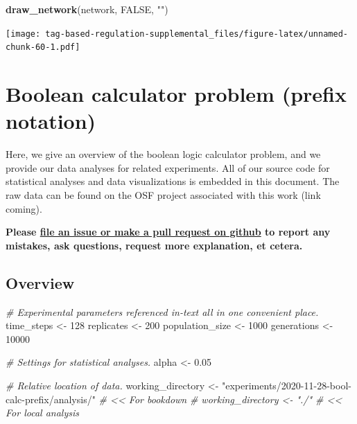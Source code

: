 \documentclass[
]{book}
\newenvironment{Shaded}{\begin{snugshade}}{\end{snugshade}}
\newcommand{\CommentTok}[1]{\textcolor[rgb]{0.56,0.35,0.01}{\textit{#1}}}
\newcommand{\DecValTok}[1]{\textcolor[rgb]{0.00,0.00,0.81}{#1}}
\newcommand{\FloatTok}[1]{\textcolor[rgb]{0.00,0.00,0.81}{#1}}
\newcommand{\KeywordTok}[1]{\textcolor[rgb]{0.13,0.29,0.53}{\textbf{#1}}}
\newcommand{\NormalTok}[1]{#1}
\newcommand{\OtherTok}[1]{\textcolor[rgb]{0.56,0.35,0.01}{#1}}
\newcommand{\StringTok}[1]{\textcolor[rgb]{0.31,0.60,0.02}{#1}}
\begin{document}
\begin{Shaded}
\begin{Highlighting}[]
\KeywordTok{draw\_network}\NormalTok{(network, }\OtherTok{FALSE}\NormalTok{, }\StringTok{""}\NormalTok{)}
\end{Highlighting}
\end{Shaded}

\texttt{[image: tag-based-regulation-supplemental\_files/figure-latex/unnamed-chunk-60-1.pdf]}

\hypertarget{boolean-calculator-problem-prefix-notation}{%
\chapter{Boolean calculator problem (prefix notation)}\label{boolean-calculator-problem-prefix-notation}}

Here, we give an overview of the boolean logic calculator problem, and we provide our data analyses for related experiments.
All of our source code for statistical analyses and data visualizations is embedded in this document.
The raw data can be found on the OSF project associated with this work (link coming).

\textbf{Please \href{https://github.com/amlalejini/Tag-based-Genetic-Regulation-for-LinearGP/issues}{file an issue or make a pull request on github} to report any mistakes, ask questions, request more explanation, et cetera.}

\hypertarget{overview-3}{%
\section{Overview}\label{overview-3}}

\begin{Shaded}
\begin{Highlighting}[]
\CommentTok{\# Experimental parameters referenced in{-}text all in one convenient place.}
\NormalTok{time\_steps \textless{}{-}}\StringTok{ }\DecValTok{128}
\NormalTok{replicates \textless{}{-}}\StringTok{ }\DecValTok{200}
\NormalTok{population\_size \textless{}{-}}\StringTok{ }\DecValTok{1000}
\NormalTok{generations \textless{}{-}}\StringTok{ }\DecValTok{10000}

\CommentTok{\# Settings for statistical analyses.}
\NormalTok{alpha \textless{}{-}}\StringTok{ }\FloatTok{0.05}

\CommentTok{\# Relative location of data.}
\NormalTok{working\_directory \textless{}{-}}\StringTok{ "experiments/2020{-}11{-}28{-}bool{-}calc{-}prefix/analysis/"} \CommentTok{\# \textless{}\textless{} For bookdown}
\CommentTok{\# working\_directory \textless{}{-} "./"                                              \# \textless{}\textless{} For local analysis}
\end{Highlighting}
\end{Shaded}
\end{document}
